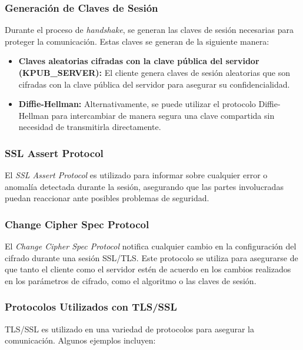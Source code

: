 \documentclass[a4paper,12pt]{article}
\begin{document}
\subsubsection{Generación de Claves de Sesión}

Durante el proceso de \textit{handshake}, se generan las claves de sesión necesarias para proteger la comunicación. Estas claves se generan de la siguiente manera:

\begin{itemize}
    \item \textbf{Claves aleatorias cifradas con la clave pública del servidor (KPUB\_SERVER):} El cliente genera claves de sesión aleatorias que son cifradas con la clave pública del servidor para asegurar su confidencialidad.
    \item \textbf{Diffie-Hellman:} Alternativamente, se puede utilizar el protocolo Diffie-Hellman para intercambiar de manera segura una clave compartida sin necesidad de transmitirla directamente.
\end{itemize}

\subsubsection{SSL Assert Protocol}

El \textit{SSL Assert Protocol} es utilizado para informar sobre cualquier error o anomalía detectada durante la sesión, asegurando que las partes involucradas puedan reaccionar ante posibles problemas de seguridad.

\subsubsection{Change Cipher Spec Protocol}

El \textit{Change Cipher Spec Protocol} notifica cualquier cambio en la configuración del cifrado durante una sesión SSL/TLS. Este protocolo se utiliza para asegurarse de que tanto el cliente como el servidor estén de acuerdo en los cambios realizados en los parámetros de cifrado, como el algoritmo o las claves de sesión.

\subsubsection{Protocolos Utilizados con TLS/SSL}

TLS/SSL es utilizado en una variedad de protocolos para asegurar la comunicación. Algunos ejemplos incluyen:
\end{document}
